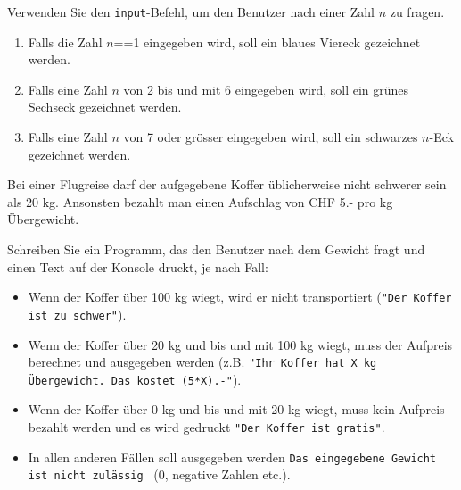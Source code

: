 \begin{myexercise}
	Verwenden Sie den \lstinline|input|-Befehl, um den Benutzer nach einer Zahl $n$ zu fragen.
	\begin{enumerate}
		\item Falls die Zahl $n$==1 eingegeben wird, soll ein blaues Viereck gezeichnet werden.
		\item Falls eine Zahl $n$ von 2 bis und mit 6 eingegeben wird, soll ein grünes Sechseck gezeichnet werden.
		\item Falls eine Zahl $n$ von 7 oder grösser eingegeben wird, soll ein schwarzes $n$-Eck gezeichnet werden.
	\end{enumerate}
	\begin{myanswer}
		
	\end{myanswer}
\end{myexercise}


\begin{myexercise}
	Bei einer Flugreise darf der aufgegebene Koffer üblicherweise nicht schwerer sein als 20 kg. Ansonsten bezahlt man einen Aufschlag von CHF 5.- pro kg Übergewicht.

	Schreiben Sie ein Programm, das den Benutzer nach dem Gewicht fragt und einen Text auf der Konsole druckt, je nach Fall:

	\begin{itemize}
		\item Wenn der Koffer über 100 kg wiegt, wird er nicht transportiert (\lstinline|"Der Koffer ist zu schwer"|).
		\item Wenn der Koffer über 20 kg und bis und mit 100 kg wiegt, muss der Aufpreis berechnet und ausgegeben werden (z.B. \lstinline|"Ihr Koffer hat X kg Übergewicht. Das kostet (5*X).-"|).
		\item Wenn der Koffer über 0 kg und bis und mit 20 kg wiegt, muss kein Aufpreis bezahlt werden und es wird gedruckt \lstinline|"Der Koffer ist gratis"|.
		\item  In allen anderen Fällen soll ausgegeben werden \lstinline|Das eingegebene Gewicht ist nicht zulässig|  (0, negative Zahlen etc.).
	\end{itemize}
	\begin{myanswer}
		
	\end{myanswer}
\end{myexercise}

